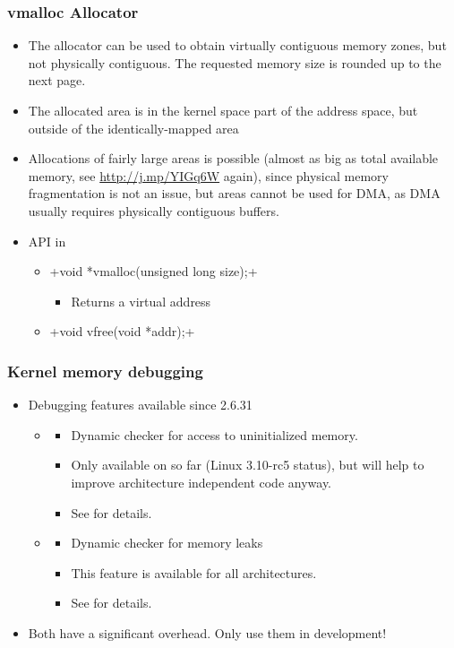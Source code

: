 \begin{frame}[fragile]
  \frametitle{vmalloc Allocator}
  \begin{itemize}
  \item The  allocator can be used to obtain virtually
    contiguous memory zones, but not physically contiguous. The
    requested memory size is rounded up to the next page.
  \item The allocated area is in the kernel space part of the address
    space, but outside of the identically-mapped area
  \item Allocations of fairly large areas is possible (almost as big
    as total available memory, see \url{http://j.mp/YIGq6W} again),
    since physical memory fragmentation is not an issue, but areas
    cannot be used for DMA, as DMA usually requires physically
    contiguous buffers.
  \item API in 
    \begin{itemize}
    \item {}+void *vmalloc(unsigned long size);+
      \begin{itemize}
      \item Returns a virtual address
      \end{itemize}
    \item {}+void vfree(void *addr);+
    \end{itemize}
  \end{itemize}
\end{frame}

\begin{frame}
  \frametitle{Kernel memory debugging}
  \begin{itemize}
  \item Debugging features available since 2.6.31
    \begin{itemize}
    \item {}
      \begin{itemize}
      \item Dynamic checker for access to uninitialized memory.
      \item Only available on  so far (Linux 3.10-rc5 status), but will
        help to improve architecture independent code anyway.
      \item See  for details.
      \end{itemize}
    \item {}
      \begin{itemize}
      \item Dynamic checker for memory leaks
      \item This feature is available for all architectures.
      \item See  for details.
      \end{itemize}
    \end{itemize}
  \item Both have a significant overhead. Only use them in development!
  \end{itemize}
\end{frame}

